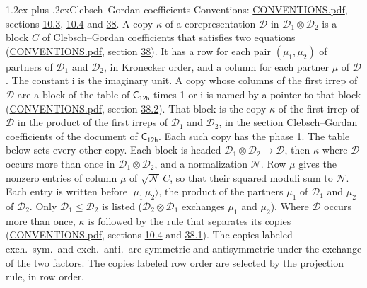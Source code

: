 \documentclass[10pt,a4paper]{article}
\makeatletter
\renewcommand\section{\@startsection{section}{1}{\z@}{-3ex plus -1ex minus -.2ex}%
  {1.2ex plus .2ex}{\normalfont\large\sffamily\bfseries\color{parttitle}}}
\numberwithin{equation}{section}
\newcommand{\grp}[1]{\mathsf{#1}}
\newcommand{\iunit}{\mathrm{i}}
\newcommand{\irrprod}{\otimes}
\newcommand{\mult}{\kappa}
\newcommand{\intx}{\mu}
\newcommand{\cgnorm}{\mathcal{N}}
\newcommand{\prodket}[2]{\lvert {#1}\,{#2}\rangle}
\makeatother
\begin{document}
\section{Clebsch--Gordan coefficients}\label{s:clebsch_gordan}
Conventions: \href{../../CONVENTIONS.pdf}{CONVENTIONS.pdf}, sections \href{../../../rotation/CONVENTIONS.pdf\#conv.10.3}{10.3}, \href{../../../rotation/CONVENTIONS.pdf\#conv.10.4}{10.4} and \href{../../CONVENTIONS.pdf\#conv.38}{38}.
\leavevmode\label{n:index.copy}\label{n:matrix.cg.stored}A copy $\mult$ of a corepresentation $\mathcal{D}$ in $\mathcal{D}_1\irrprod\mathcal{D}_2$ is a block $C$ of Clebsch--Gordan coefficients that satisfies two equations (\href{../../CONVENTIONS.pdf}{CONVENTIONS.pdf}, section \href{../../CONVENTIONS.pdf\#conv.38}{38}). \label{n:index.cg}It has a row for each pair $(\intx_1, \intx_2)$ of partners of $\mathcal{D}_1$ and $\mathcal{D}_2$, in Kronecker order, and a column for each partner $\intx$ of $\mathcal{D}$.
The constant $\iunit$ is the imaginary unit.
A copy whose columns of the first irrep of $\mathcal{D}$ are a block of the table of $\grp{C_{12h}}$ times 1 or $\iunit$ is named by a pointer to that block (\href{../../CONVENTIONS.pdf}{CONVENTIONS.pdf}, section \href{../../CONVENTIONS.pdf\#conv.38.2}{38.2}). That block is the copy $\mult$ of the first irrep of $\mathcal{D}$ in the product of the first irreps of $\mathcal{D}_1$ and $\mathcal{D}_2$, in the section Clebsch--Gordan coefficients of the document of \href{../../../rotation/data/pdf/C12h.pdf}{$\grp{C_{12h}}$}. Each such copy has the phase 1. The table below sets every other copy.
Each block is headed $\mathcal{D}_1\irrprod\mathcal{D}_2\to\mathcal{D}$, then $\mult$ where $\mathcal{D}$ occurs more than once in $\mathcal{D}_1\irrprod\mathcal{D}_2$, and a normalization $\cgnorm$. Row $\intx$ gives the nonzero entries of column $\intx$ of $\sqrt{\cgnorm}\,C$, so that their squared moduli sum to $\cgnorm$. \label{n:vector.ket.product}Each entry is written before $\prodket{\intx_1}{\intx_2}$, the product of the partners $\intx_1$ of $\mathcal{D}_1$ and $\intx_2$ of $\mathcal{D}_2$. Only $\mathcal{D}_1 \le \mathcal{D}_2$ is listed ($\mathcal{D}_2\irrprod\mathcal{D}_1$ exchanges $\intx_1$ and $\intx_2$).
Where $\mathcal{D}$ occurs more than once, $\mult$ is followed by the rule that separates its copies (\href{../../CONVENTIONS.pdf}{CONVENTIONS.pdf}, sections \href{../../../rotation/CONVENTIONS.pdf\#conv.10.4}{10.4} and \href{../../CONVENTIONS.pdf\#conv.38.1}{38.1}). \label{n:abbreviation.exchange}The copies labeled exch.\ sym.\ and exch.\ anti.\ are symmetric and antisymmetric under the exchange of the two factors. The copies labeled row order are selected by the projection rule, in row order.
\end{document}
